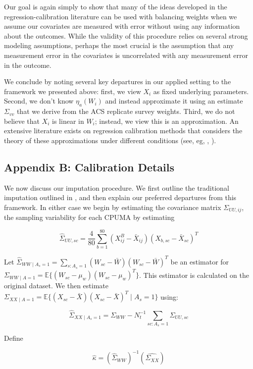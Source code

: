 \documentclass[12pt]{article}
\begin{document}
Our goal is again simply to show that many of the ideas developed in the regression-calibration literature can be used with balancing weights when we assume our covariates are measured with error without using any information about the outcomes. While the validity of this procedure relies on several strong modeling assumptions, perhaps the most crucial is the assumption that any measurement error in the covariates is uncorrelated with any measurement error in the outcome. 

We conclude by noting several key departures in our applied setting to the framework we presented above: first, we view $X_i$ as fixed underlying parameters. Second, we don't know $\eta_a(W_i)$ and instead approximate it using an estimate $\Sigma_{vv}$ that we derive from the ACS replicate survey weights. Third, we do not believe that $X_i$ is linear in $W_i$; instead, we view this is an approximation. An extensive literature exists on regression calibration methods that considers the theory of these approximations under different conditions (see, eg, \cite{gleser1992importance}, \cite{carroll2006measurement}).

\subsection{Appendix B: Calibration Details}

We now discuss our imputation procedure. We first outline the traditional imputation outlined in \cite{carroll2006measurement}, and then explain our preferred departures from this framework. In either case we begin by estimating the covariance matrix $\Sigma_{UU, ij}$, the sampling variability for each CPUMA by estimating

$$
\hat{\Sigma}_{UU, sc} = \frac{4}{80}\sum_{b=1}^{80}(X_{ij}^B - \bar{X}_{ij})(X_{b, sc} - \bar{X}_{sc})^T
$$

Let $\hat{\Sigma}_{WW \mid A_s = 1} = \sum_{s: A_s = 1} (W_{sc} - \bar{W})(W_{sc} - \bar{W})^T$ be an estimator for $\Sigma_{WW \mid A = 1} = \mathbb{E}\{(W_{sc} - \mu_w)(W_{sc} - \mu_w)^T\}$. This estimator is calculated on the original dataset. We then estimate $\Sigma_{XX \mid A = 1} = \mathbb{E}\{(X_{sc} - \bar{X})(X_{sc} - \bar{X})^T \mid A_s = 1\}$ using:

$$
\hat{\Sigma}_{XX \mid A_s = 1} = \Sigma_{WW} - N_t^{-1}\sum_{sc: A_s = 1} \Sigma_{UU, sc}
$$

Define

$$
\hat{\kappa} = (\hat{\Sigma}_{WW})^{-1}(\hat{\Sigma_{XX}})
$$
\end{document}
